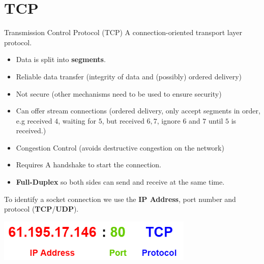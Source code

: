 \section{TCP}
\begin{definitionbox}{Transmission Control Protocol (TCP)}
    A connection-oriented transport layer protocol.
    \begin{itemize}
        \setlength\itemsep{0em}
        \item Data is split into \textbf{segments}.
        \item Reliable data transfer (integrity of data and (possibly) ordered delivery)
        \item Not secure (other mechanisms need to be used to ensure security)
        \item Can offer stream connections (ordered delivery, only accept segments in order, e.g received $4$, waiting for $5$, but received $6,7$, ignore $6$ and $7$ until $5$ is received.)
        \item Congestion Control (avoids destructive congestion on the network)
        \item Requires A handshake to start the connection.
        \item \textbf{Full-Duplex} so both sides can send and receive at the same time.
    \end{itemize}
\end{definitionbox}

To identify a socket connection we use the \textbf{IP Address}, port number and protocol (\textbf{TCP}/\textbf{UDP}).
\begin{center}\includegraphics[width=0.7\textwidth]{transport_layer/images/socket id.png}\end{center}

